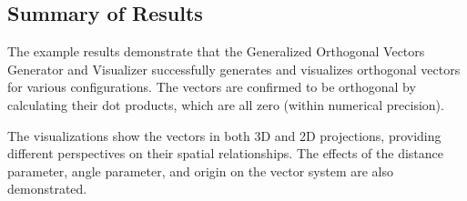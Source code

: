 \subsection{Summary of Results}

The example results demonstrate that the Generalized Orthogonal Vectors Generator and Visualizer successfully generates and visualizes orthogonal vectors for various configurations. The vectors are confirmed to be orthogonal by calculating their dot products, which are all zero (within numerical precision).

The visualizations show the vectors in both 3D and 2D projections, providing different perspectives on their spatial relationships. The effects of the distance parameter, angle parameter, and origin on the vector system are also demonstrated.
